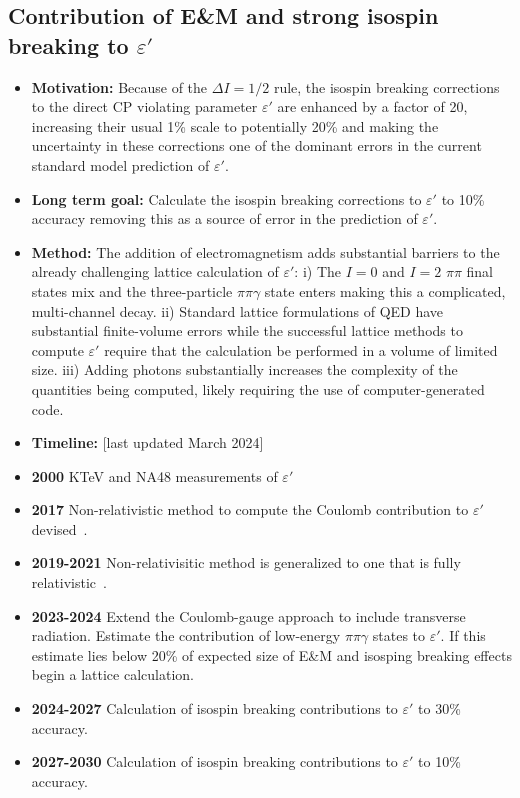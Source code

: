 \documentclass[12pt,hyperpdf]{article}
\begin{document}
\subsection{Contribution of E\&M and strong isospin breaking to $\varepsilon'$}
\begin{itemize}
    \item{\bf Motivation:} Because of the $\Delta I=1/2$ rule, the isospin breaking corrections to the direct CP violating parameter $\varepsilon'$ are enhanced by a factor of 20, increasing their usual 1\% scale to potentially 20\% and making the uncertainty in these corrections one of the dominant errors in the current standard model prediction of $\varepsilon'$.
    \item{\bf Long term goal:} Calculate the isospin breaking corrections to $\varepsilon'$ to 10\% accuracy removing this as a source of error in the prediction of $\varepsilon'$.
    \item{\bf Method:} The addition of electromagnetism adds substantial barriers to the already challenging lattice calculation of $\varepsilon'$:  i) The $I=0$ and $I=2$ $\pi\pi$ final states mix and the three-particle $\pi\pi\gamma$ state enters making this a complicated, multi-channel decay. ii)  Standard lattice formulations of QED have substantial finite-volume errors while the successful lattice methods to compute $\varepsilon'$ require that the calculation be performed in a volume of limited size.  iii) Adding photons substantially increases the complexity of the quantities being computed, likely requiring the use of computer-generated code.
\item{\bf Timeline:}  \hfill [last updated March 2024]
    \item{\bf 2000} KTeV and NA48 measurements of $\varepsilon'$
    \item{\bf 2017} Non-relativistic method to compute the Coulomb contribution to $\varepsilon'$ devised~\cite{Christ:2017pze}.
    \item{\bf 2019-2021} Non-relativisitic method is generalized to one that is fully relativistic~\cite{Christ:2021guf}.
    \item{\bf 2023-2024} Extend the Coulomb-gauge approach to include transverse radiation.  Estimate the contribution of low-energy $\pi\pi\gamma$ states to $\varepsilon'$.  If this estimate lies below 20\% of expected size of E\&M and isosping breaking effects begin a lattice calculation.
    \item{\bf 2024-2027} Calculation of isospin breaking contributions to $\varepsilon'$ to 30\% accuracy.
    \item{\bf 2027-2030} Calculation of isospin breaking contributions to $\varepsilon'$ to 10\% accuracy.
\end{itemize}
\end{document}
